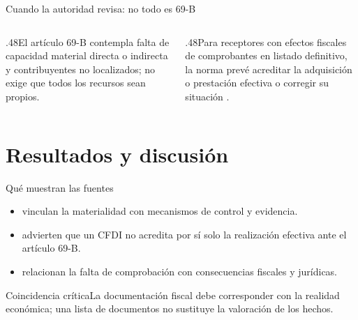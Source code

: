 \documentclass[spanish,aspectratio=169,xcolor={dvipsnames,table}]{beamer}
\begin{document}
\begin{frame}{Cuando la autoridad revisa: no todo es 69-B}
  \begin{center}
  \end{center}
  \vfill
  \begin{columns}[T]
    \begin{column}{.48\textwidth}\small El artículo 69-B contempla falta de capacidad material directa o indirecta y contribuyentes no localizados; no exige que todos los recursos sean propios.\end{column}
    \begin{column}{.48\textwidth}\small Para receptores con efectos fiscales de comprobantes en listado definitivo, la norma prevé acreditar la adquisición o prestación efectiva o corregir su situación \parencite[arts. 42, 49 Bis y 69-B]{cff2026}.\end{column}
  \end{columns}
\end{frame}

\section{Resultados y discusión}
\begin{frame}{Qué muestran las fuentes}
  \begin{itemize}
    \item \textcite{rico2023mecanismo} vinculan la materialidad con mecanismos de control y evidencia.
    \item \textcite{arrona2022certeza} advierten que un CFDI no acredita por sí solo la realización efectiva ante el artículo 69-B.
    \item \textcite{rico2024consecuencias} relacionan la falta de comprobación con consecuencias fiscales y jurídicas.
  \end{itemize}
  \vfill
  \begin{alertblock}{Coincidencia crítica}\centering La documentación fiscal debe corresponder con la realidad económica; una lista de documentos no sustituye la valoración de los hechos.\end{alertblock}
\end{frame}
\end{document}
